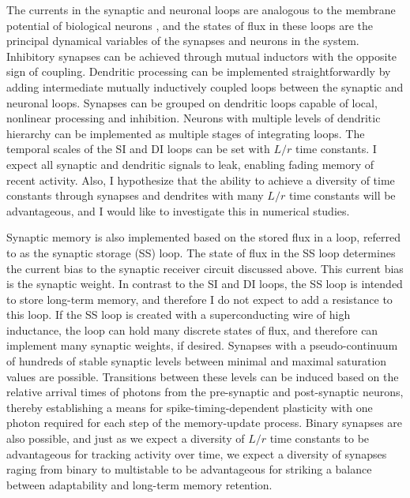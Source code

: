 \documentclass[twocolumn]{article}
\begin{document}
The currents in the synaptic and neuronal loops are analogous to the membrane potential of biological neurons \cite{daab2001,geki2002}, and the states of flux in these loops are the principal dynamical variables of the synapses and neurons in the system. Inhibitory synapses can be achieved through mutual inductors with the opposite sign of coupling. Dendritic processing can be implemented straightforwardly by adding intermediate mutually inductively coupled loops between the synaptic and neuronal loops. Synapses can be grouped on dendritic loops capable of local, nonlinear processing and inhibition. Neurons with multiple levels of dendritic hierarchy can be implemented as multiple stages of integrating loops. The temporal scales of the SI and DI loops can be set with $L/r$ time constants. I expect all synaptic and dendritic signals to leak, enabling fading memory of recent activity. Also, I hypothesize that the ability to achieve a diversity of time constants through synapses and dendrites with many $L/r$ time constants will be advantageous, and I would like to investigate this in numerical studies.

Synaptic memory is also implemented based on the stored flux in a loop, referred to as the synaptic storage (SS) loop. The state of flux in the SS loop determines the current bias to the synaptic receiver circuit discussed above. This current bias is the synaptic weight. In contrast to the SI and DI loops, the SS loop is intended to store long-term memory, and therefore I do not expect to add a resistance to this loop. If the SS loop is created with a superconducting wire of high inductance, the loop can hold many discrete states of flux, and therefore can implement many synaptic weights, if desired. Synapses with a pseudo-continuum of hundreds of stable synaptic levels between minimal and maximal saturation values are possible. Transitions between these levels can be induced based on the relative arrival times of photons from the pre-synaptic and post-synaptic neurons, thereby establishing a means for spike-timing-dependent plasticity with one photon required for each step of the memory-update process. Binary synapses are also possible, and just as we expect a diversity of $L/r$ time constants to be advantageous for tracking activity over time, we expect a diversity of synapses raging from binary to multistable to be advantageous for striking a balance between adaptability and long-term memory retention.
\end{document}
